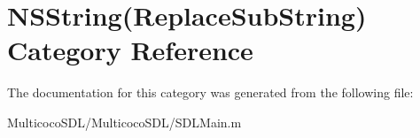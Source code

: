 \hypertarget{category_n_s_string_07_replace_sub_string_08}{\section{N\-S\-String(Replace\-Sub\-String) Category Reference}
\label{category_n_s_string_07_replace_sub_string_08}
}


The documentation for this category was generated from the following file\-:\begin{DoxyCompactItemize}
\item 
Multicoco\-S\-D\-L/\-Multicoco\-S\-D\-L/S\-D\-L\-Main.\-m\end{DoxyCompactItemize}
